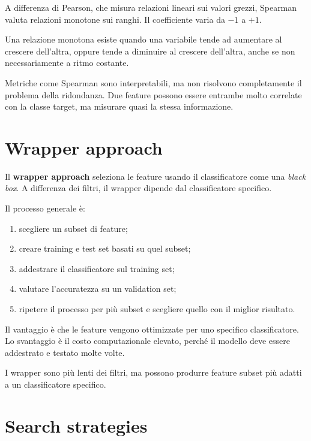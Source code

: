 \begin{notaslide}
A differenza di Pearson, che misura relazioni lineari sui valori grezzi, Spearman valuta relazioni monotone sui ranghi. Il coefficiente varia da \(-1\) a \(+1\).
\end{notaslide}

Una relazione monotona esiste quando una variabile tende ad aumentare al crescere dell'altra, oppure tende a diminuire al crescere dell'altra, anche se non necessariamente a ritmo costante.

\begin{notaprof}
Metriche come Spearman sono interpretabili, ma non risolvono completamente il problema della ridondanza. Due feature possono essere entrambe molto correlate con la classe target, ma misurare quasi la stessa informazione.
\end{notaprof}

\section{Wrapper approach}

Il \textbf{wrapper approach} seleziona le feature usando il classificatore come una \emph{black box}. A differenza dei filtri, il wrapper dipende dal classificatore specifico.

Il processo generale è:

\begin{enumerate}
    \item scegliere un subset di feature;
    \item creare training e test set basati su quel subset;
    \item addestrare il classificatore sul training set;
    \item valutare l'accuratezza su un validation set;
    \item ripetere il processo per più subset e scegliere quello con il miglior risultato.
\end{enumerate}

Il vantaggio è che le feature vengono ottimizzate per uno specifico classificatore. Lo svantaggio è il costo computazionale elevato, perché il modello deve essere addestrato e testato molte volte.

\begin{notaprof}
I wrapper sono più lenti dei filtri, ma possono produrre feature subset più adatti a un classificatore specifico.
\end{notaprof}

\section{Search strategies}

